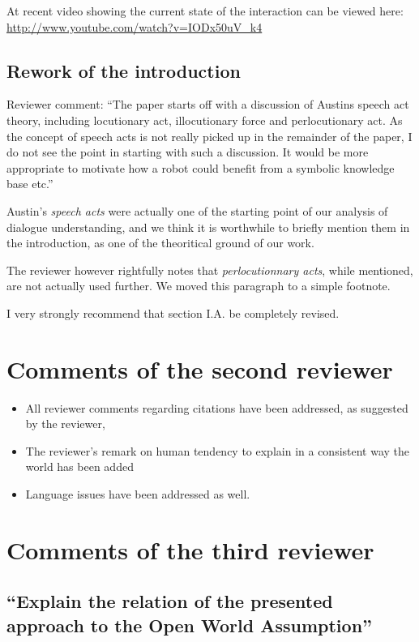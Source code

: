 \documentclass{article}
\begin{document}
At recent video showing the current state of the interaction can be viewed
here: \url{http://www.youtube.com/watch?v=IODx50uV_k4}

\subsection{Rework of the introduction} 

Reviewer comment: ``The paper starts off with a discussion
of Austins speech act theory, including locutionary act, illocutionary force
and perlocutionary act. As the concept of speech acts is not really picked up
in the remainder of the paper, I do not see the point in starting with such a
discussion. It would be more appropriate to motivate how a robot could benefit
from a symbolic knowledge base etc.''

Austin's \emph{speech acts} were actually one of the starting point of our
analysis of dialogue understanding, and we think it is worthwhile to briefly mention
them in the introduction, as one of the theoritical ground of our work.

The reviewer however rightfully notes that \emph{perlocutionnary acts}, while mentioned, are not
actually used further. We moved this paragraph to a simple footnote.

I very strongly recommend that section I.A. be completely revised.


\section{Comments of the second reviewer}

\begin{itemize}
\item All reviewer comments regarding citations have been addressed, as suggested by the reviewer,
\item The reviewer's remark on human tendency to explain in a consistent way the world has been added
\item Language issues have been addressed as well.
\end{itemize}

\section{Comments of the third reviewer}

\subsection{``Explain the relation of the presented approach to the Open World
Assumption''}
\end{document}

